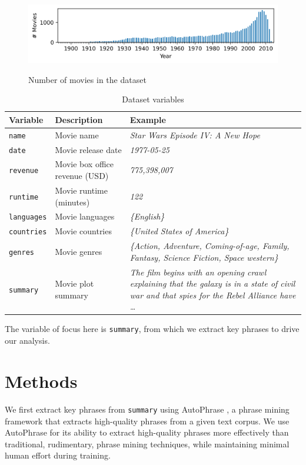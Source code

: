 \documentclass[hidelinks]{article}
\begin{document}
\begin{multicols}{2}
\begin{figure}
\caption{Number of movies in the dataset}
\centering
\includegraphics[width=5in]{figures/number_movies_per_year_bar_chart.png}
\label{figure:number_movies_per_year_bar_chart}
\end{figure}

\begin{table}
\caption{Dataset variables}
\centering
\begin{tabularx}{.8\textwidth}{llX}
    \textbf{Variable} & \textbf{Description} & \textbf{Example} \\
    \hline
    \texttt{name} & Movie name & \textit{Star Wars Episode IV: A New Hope} \\
    \texttt{date} & Movie release date & \textit{1977-05-25} \\
    \texttt{revenue} & Movie box office revenue (USD) & \textit{775,398,007} \\
    \texttt{runtime} & Movie runtime (minutes) & \textit{122} \\
    \texttt{languages} & Movie languages & \textit{\{English\}} \\
    \texttt{countries} & Movie countries & \textit{\{United States of America\}} \\
    \texttt{genres} & Movie genres & \textit{\{Action, Adventure, Coming-of-age, Family, Fantasy, Science Fiction, Space western\}} \\
    \texttt{summary} & Movie plot summary & \textit{The film begins with an opening crawl explaining that the galaxy is in a state of civil war and that spies for the Rebel Alliance have \ldots} \\
\end{tabularx}
\label{table:variables}
\end{table}

The variable of focus here is \texttt{summary}, from which we extract key phrases to drive our analysis.

\section{Methods} %
We first extract key phrases from \texttt{summary} using AutoPhrase \cite{DBLP:journals/corr/ShangLJRVH17}, a phrase mining framework that extracts high-quality phrases from a given text corpus. We use AutoPhrase for its ability to extract high-quality phrases more effectively than traditional, rudimentary, phrase mining techniques, while maintaining minimal human effort during training.


\end{multicols}
\end{document}
